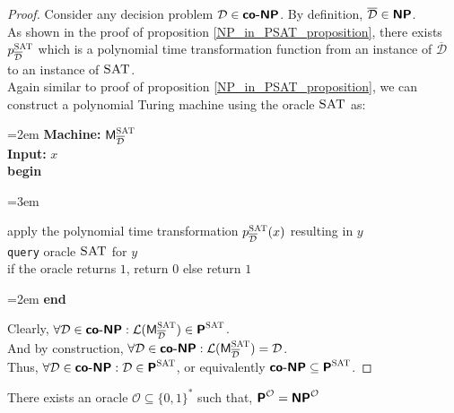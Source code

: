 \documentclass[usletter]{article}
\newcommand {\langset}[1]      {\ensuremath{\mathcal{#1}}}
\newcommand {\namedlangset}[1] {\ensuremath{\textnormal{\textsc{#1}}}}
\newcommand {\machine}[1]      {\ensuremath{\textnormal{\textsf{#1}}}}
\newcommand {\family}[1]       {\ensuremath{\textnormal{\textsf{\textbf{#1}}}}}
\newenvironment{turing}[2]{
  \par\smallskip\leftskip=2em
  \noindent\ignorespaces
  \textbf{Machine:} #1\\
  \textbf{Input:} #2\\[5pt]
  \textbf{begin}
  \par\leftskip=3em
  \noindent\ignorespaces
}{
  \par\leftskip=2em
  \noindent\ignorespaces
  \textbf{end}
  \par\medskip
}
\begin{document}
\begin{proof}
Consider any decision problem $\langset{D} \in \family{co-NP}$.
By definition, $\overline{\langset{D}} \in \family{NP}$. \\
As shown in the proof of proposition \ref{NP_in_PSAT_proposition},
there exists $p_{\overline{\langset{D}}}^\namedlangset{SAT}$ which is
a polynomial time transformation function from
an instance of $\overline{\langset{D}}$ to an instance of \namedlangset{SAT}. \\

\noindent
Again similar to proof of proposition \ref{NP_in_PSAT_proposition}, we can
construct a polynomial Turing machine using the oracle \namedlangset{SAT} as:
\begin{turing}{$\machine{M}^\namedlangset{SAT}_{\overline{\langset{D}}}$}{$x$}
  apply the polynomial time transformation
  $p_{\overline{\langset{D}}}^\namedlangset{SAT}(x)$ resulting in $y$\\
  \texttt{query} oracle \namedlangset{SAT} for $y$ \\
  if the oracle returns $1$, return $0$ else return $1$
\end{turing}

\noindent
Clearly, $\forall \langset{D} \in \family{co-NP}
  : \langset{L}(\machine{M}^\namedlangset{SAT}_{\overline{\langset{D}}})
    \in \family{P}^\namedlangset{SAT}$. \\
And by construction, $\forall \langset{D} \in \family{co-NP}
  : \langset{L}(\machine{M}^\namedlangset{SAT}_{\overline{\langset{D}}})
= \langset{D}$. \\

\noindent
Thus, $\forall \langset{D} \in \family{co-NP}
  : \langset{D} \in \family{P}^\namedlangset{SAT}$,
or equivalently $ \family{co-NP} \subseteq \family{P}^\namedlangset{SAT}$.
\end{proof}

\begin{theorem}
There exists an oracle $\langset{O} \subseteq \{0,1\}^*$ such that,
$\family{P}^\langset{O} = \family{NP}^\langset{O}$
\end{theorem}
\end{document}
